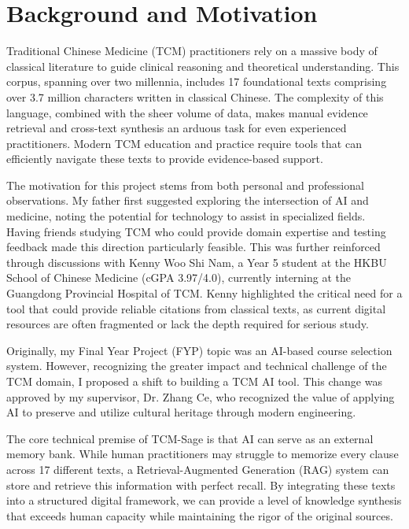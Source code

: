\documentclass[11pt,a4paper]{report}
\begin{document}
\section{Background and Motivation}
Traditional Chinese Medicine (TCM) practitioners rely on a massive body of classical literature to guide clinical reasoning and theoretical understanding. This corpus, spanning over two millennia, includes 17 foundational texts comprising over 3.7 million characters written in classical Chinese. The complexity of this language, combined with the sheer volume of data, makes manual evidence retrieval and cross-text synthesis an arduous task for even experienced practitioners. Modern TCM education and practice require tools that can efficiently navigate these texts to provide evidence-based support.

The motivation for this project stems from both personal and professional observations. My father first suggested exploring the intersection of AI and medicine, noting the potential for technology to assist in specialized fields. Having friends studying TCM who could provide domain expertise and testing feedback made this direction particularly feasible. This was further reinforced through discussions with Kenny Woo Shi Nam, a Year 5 student at the HKBU School of Chinese Medicine (cGPA 3.97/4.0), currently interning at the Guangdong Provincial Hospital of TCM. Kenny highlighted the critical need for a tool that could provide reliable citations from classical texts, as current digital resources are often fragmented or lack the depth required for serious study.

Originally, my Final Year Project (FYP) topic was an AI-based course selection system. However, recognizing the greater impact and technical challenge of the TCM domain, I proposed a shift to building a TCM AI tool. This change was approved by my supervisor, Dr. Zhang Ce, who recognized the value of applying AI to preserve and utilize cultural heritage through modern engineering.

The core technical premise of TCM-Sage is that AI can serve as an external memory bank. While human practitioners may struggle to memorize every clause across 17 different texts, a Retrieval-Augmented Generation (RAG) system can store and retrieve this information with perfect recall. By integrating these texts into a structured digital framework, we can provide a level of knowledge synthesis that exceeds human capacity while maintaining the rigor of the original sources.
\end{document}
